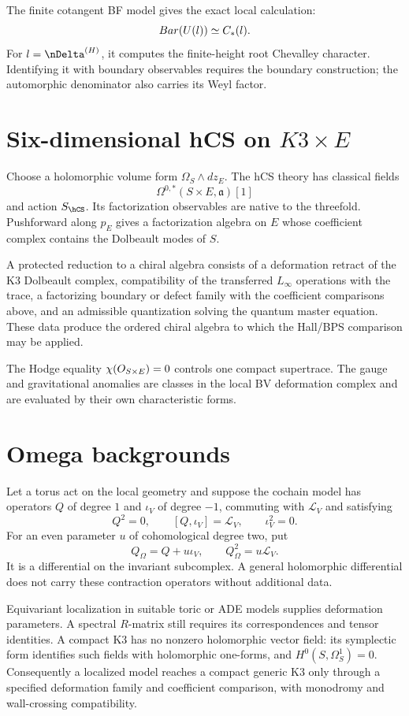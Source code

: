 The finite cotangent BF model gives the exact local calculation:
\[
 Bar(U(l))\simeq C_*(l).
\]
For $\mathfrak l=\nDelta^{(H)}$, it computes the finite-height root
Chevalley character. Identifying it with boundary observables requires
the boundary construction; the automorphic denominator also carries
its Weyl factor.

\section{Six-dimensional hCS on \texorpdfstring{$K3\times E$}{K3 x E}}
Choose a holomorphic volume form $\Omega_S\wedge dz_E$. The hCS theory has classical fields
\[
 \Omega^{0,*}(S\times E,\mathfrak a)[1]
\]
and action $S_{\hCS}$. Its factorization observables are native to the threefold. Pushforward along $p_E$ gives a factorization algebra on $E$ whose coefficient complex contains the Dolbeault modes of $S$.

A protected reduction to a chiral algebra consists of a deformation retract of the K3 Dolbeault complex, compatibility of the transferred $L_\infty$ operations with the trace, a factorizing boundary or defect family with the coefficient comparisons above, and an admissible quantization solving the quantum master equation. These data produce the ordered chiral algebra to which the Hall/BPS comparison may be applied.

The Hodge equality $\chi(O_{S\times E})=0$ controls one compact supertrace. The gauge and gravitational anomalies are classes in the local BV deformation complex and are evaluated by their own characteristic forms.

\section{Omega backgrounds}
Let a torus act on the local geometry and suppose the cochain model
has operators $Q$ of degree $1$ and $\iota_V$ of degree $-1$, commuting with $\mathcal L_V$ and satisfying
\[
 Q^2=0,\qquad [Q,\iota_V]=\mathcal L_V,\qquad \iota_V^2=0.
\]
For an even parameter $u$ of cohomological degree two, put
\[
 Q_\Omega=Q+u\iota_V,\qquad Q_\Omega^2=u\mathcal L_V.
\]
It is a differential on the invariant subcomplex. A general
holomorphic differential does not carry these contraction operators
without additional data.

Equivariant localization in suitable toric or ADE models supplies
deformation parameters. A spectral $R$-matrix still requires its
correspondences and tensor identities. A compact K3 has no nonzero
holomorphic vector field: its symplectic form identifies such fields
with holomorphic one-forms, and $H^0(S,\Omega_S^1)=0$.
Consequently a localized model reaches a compact generic K3 only
through a specified deformation family and coefficient comparison,
with monodromy and wall-crossing compatibility.

